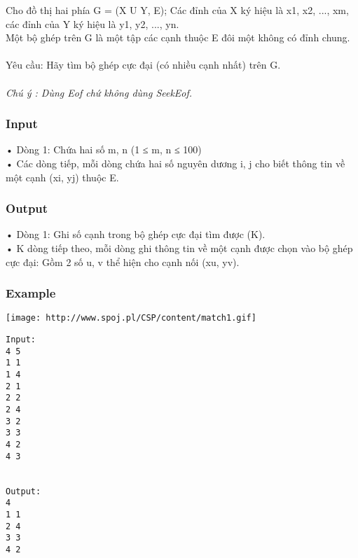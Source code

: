 



   Cho đồ thị hai phía G = (X U Y, E); Các đỉnh của X ký hiệu là x1, x2, ..., xm, các đỉnh của Y ký hiệu là y1, y2, ..., yn.   
\\   Một bộ ghép trên G là một tập các cạnh thuộc E đôi một không có đỉnh chung.   
\\
\\       Yêu cầu: Hãy tìm bộ ghép cực đại (có nhiều cạnh nhất) trên G.      
\\
\\\textit{    Chú ý : Dùng         Eof        chứ không dùng         SeekEof.       }

\subsubsection{   Input  }

   • Dòng 1: Chứa hai số m, n (1 ≤ m, n ≤ 100)   
\\   • Các dòng tiếp, mỗi dòng chứa hai số nguyên dương i, j cho biết thông tin về một cạnh (xi, yj) thuộc E.  

\subsubsection{   Output  }

   • Dòng 1: Ghi số cạnh trong bộ ghép cực đại tìm được (K).   
\\   • K dòng tiếp theo, mỗi dòng ghi thông tin về một cạnh được chọn vào bộ ghép cực đại: Gồm 2 số u, v thể hiện cho cạnh nối (xu, yv).  

\subsubsection{   Example  }
\texttt{[image: http://www.spoj.pl/CSP/content/match1.gif]}
\begin{verbatim}
Input:
4 5
1 1
1 4
2 1
2 2
2 4
3 2
3 3
4 2
4 3


Output:
4
1 1
2 4
3 3
4 2

\end{verbatim}